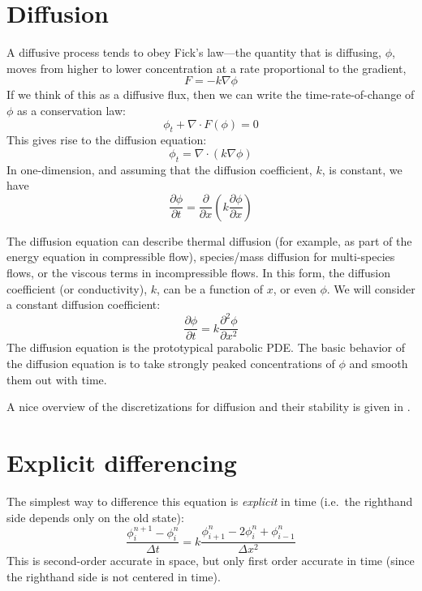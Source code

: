 \label{ch:diffusion}

\section{Diffusion}

A diffusive process tends to obey Fick's law---the quantity that is
diffusing, $\phi$, moves from higher to lower concentration at a rate
proportional to the gradient,
\begin{equation}
  F = - k \nabla \phi
\end{equation}
If we think of this as a diffusive flux, then we can write the time-rate-of-change of $\phi$ as a conservation law:
\begin{equation}
  \phi_t + \nabla\cdot F(\phi) = 0
\end{equation}
This gives rise to the diffusion equation:
\begin{equation}
\phi_t = \nabla \cdot (k \nabla \phi)
\end{equation}
In one-dimension, and assuming that the diffusion coefficient, $k$, is 
constant, we have
\begin{equation}
\frac{\partial \phi}{\partial t} = 
  \frac{\partial }{\partial x} 
  \left ( k \frac{\partial \phi}{\partial x} \right )
\end{equation}


The diffusion equation can describe thermal diffusion (for example, as
part of the energy equation in compressible flow), species/mass
diffusion for multi-species flows, or the viscous terms in
incompressible flows.  In this form, the diffusion coefficient (or
conductivity), $k$, can be a function of $x$, or even $\phi$.  We will
consider a constant diffusion coefficient:
\begin{equation}
\frac{\partial \phi}{\partial t} = k \frac{\partial^2 \phi}{\partial x^2}
\end{equation}
The diffusion equation is the prototypical parabolic PDE.
The basic behavior of the diffusion equation is to take strongly peaked
concentrations of $\phi$ and smooth them out with time.

A nice overview of the discretizations for diffusion and their stability
is given in \cite{richtmyermorton}.


\section{Explicit differencing}

The simplest way to difference this equation is {\em explicit} in time
(i.e.\ the righthand side depends only on the old state):
\begin{equation}
\label{eq:diff:explicitdiff}
\frac{\phi_i^{n+1} - \phi_i^n}{\Delta t} = 
  k \frac{\phi_{i+1}^n - 2\phi_i^n + \phi_{i-1}^n}{\Delta x^2}
\end{equation}
This is second-order accurate in space, but only first order accurate in
time (since the righthand side is not centered in time).

